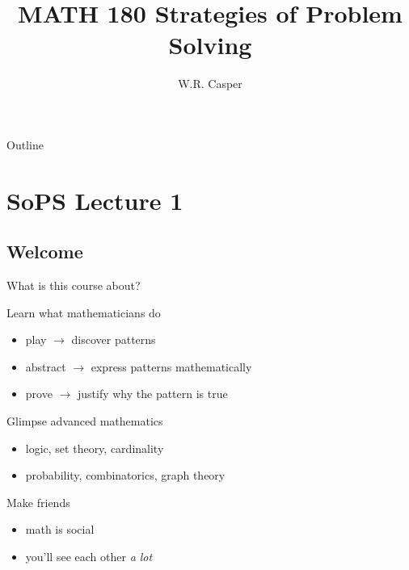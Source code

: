 \documentclass{beamer}
\title{MATH 180 Strategies of Problem Solving}
\subtitle
{} %
\author[W.R. Casper] %
{W.R. Casper}
\institute[California State University Fullerton] %
{
  Department of Mathematics\\
  California State University Fullerton}
\begin{document}
\begin{frame}
  \titlepage
\end{frame}

\begin{frame}{Outline}
  \tableofcontents
\end{frame}



\section{SoPS Lecture 1}
\subsection{Welcome}

\begin{frame}{What is this course about?}
  \begin{block}{Learn what mathematicians do}
    \begin{itemize}
      \item play $\rightarrow$ discover patterns
      \item abstract $\rightarrow$ express patterns mathematically
      \item prove $\rightarrow$ justify why the pattern is true
    \end{itemize}
  \end{block}
  \begin{block}{Glimpse advanced mathematics}
    \begin{itemize}
      \item logic, set theory, cardinality
      \item probability, combinatorics, graph theory
    \end{itemize}
  \end{block}
  \begin{block}{Make friends}
    \begin{itemize}
      \item math is {\color{red}social}
      \item you'll see each other \emph{a lot}
    \end{itemize}
  \end{block}
\end{frame}
\end{document}
